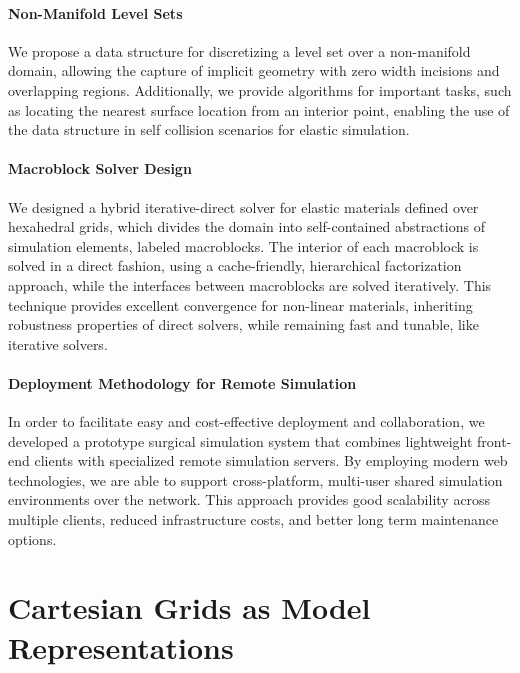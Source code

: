 \paragraph{Non-Manifold Level Sets} We propose a data structure for
discretizing a level set over a non-manifold domain, allowing the
capture of implicit geometry with zero width incisions and overlapping
regions. Additionally, we provide algorithms for important tasks, such
as locating the nearest surface location from an interior point,
enabling the use of the data structure in self collision scenarios for
elastic simulation.
 
\paragraph{Macroblock Solver Design} We designed a hybrid
iterative-direct solver for elastic materials defined over hexahedral
grids, which divides the domain into self-contained abstractions of
simulation elements, labeled macroblocks. The interior of each
macroblock is solved in a direct fashion, using a cache-friendly,
hierarchical factorization approach, while the interfaces between
macroblocks are solved iteratively. This technique provides excellent
convergence for non-linear materials, inheriting robustness properties
of direct solvers, while remaining fast and tunable, like iterative
solvers.

\paragraph{Deployment Methodology for Remote Simulation} In order to
facilitate easy and cost-effective deployment and collaboration, we
developed a prototype surgical simulation system that combines
lightweight front-end clients with specialized remote simulation
servers. By employing modern web technologies, we are able to support
cross-platform, multi-user shared simulation environments over the
network. This approach provides good scalability across multiple
clients, reduced infrastructure costs, and better long term
maintenance options.

\section{Cartesian Grids as Model Representations}

